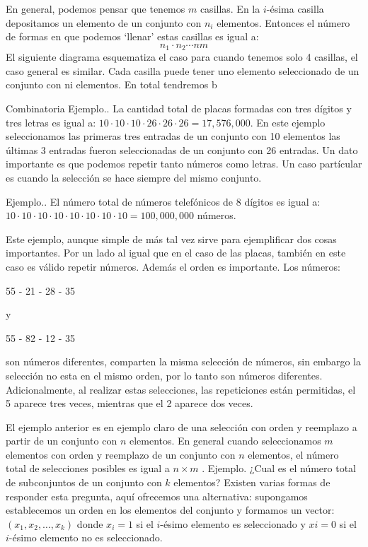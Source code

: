 \documentclass[14pt]{extreport}
\theoremstyle{definicion}
\theoremstyle{propiedad}
\begin{document}
En general, podemos pensar que tenemos $m$ casillas. En la $i$-ésima casilla depositamos un elemento de un conjunto con $n_i$ elementos. Entonces el número de formas en que podemos `llenar' estas casillas es igual a:
$$
  n_1\cdot n_2 \cdots nm
$$
El siguiente diagrama esquematiza el caso para cuando tenemos solo 4 casillas, el caso general es similar. Cada casilla puede tener uno elemento seleccionado de un conjunto con ni elementos. En total tendremos b

Combinatoria Ejemplo.. La cantidad total de placas formadas con tres dígitos y tres letras es igual a: $10 \cdot 10 \cdot 10 \cdot 26 \cdot 26 \cdot 26 = 17,576,000$. En este ejemplo seleccionamos las primeras tres entradas de un conjunto con 10 elementos las últimas 3 entradas fueron seleccionadas de un conjunto con 26 entradas. Un dato importante es que podemos repetir tanto números como letras. Un caso partícular es cuando la selección se hace siempre del mismo conjunto.

Ejemplo.. El número total de números telefónicos de 8 dígitos es igual a: $10 \cdot 10 \cdot 10 \cdot 10 \cdot 10 \cdot 10 \cdot 10 \cdot 10 = 100, 000, 000$ números.

Este ejemplo, aunque simple de más tal vez sirve para ejemplificar dos cosas importantes. Por un lado al igual que en el caso de las placas, también en este caso es válido repetir números. Además el orden es importante. Los números:

\begin{center}
  55 - 21 - 28 - 35
\end{center}

y
\begin{center}
  55 - 82 - 12 - 35
\end{center}


son números diferentes, comparten la misma selección de números, sin embargo la selección no esta en el mismo orden, por lo tanto son números diferentes. Adicionalmente, al realizar estas selecciones, las repeticiones están permitidas, el 5 aparece tres veces, mientras que el 2 aparece dos veces.

El ejemplo anterior es en ejemplo claro de una selección con orden y reemplazo a partir de un conjunto con $n$ elementos. En general cuando seleccionamos $m$ elementos con orden y reemplazo de un conjunto con $n$ elementos, el número total de selecciones posibles es igual a $n\times m$ . Ejemplo. ¿Cual es el número total de subconjuntos de un conjunto con $k$ elementos? Existen varias formas de responder esta pregunta, aquí ofrecemos una alternativa: supongamos establecemos un orden en los elementos del conjunto y formamos un vector: $(x_1 , x_2,\ldots, x_k )$ donde $x_i = 1$ si el $i$-ésimo elemento es seleccionado y $xi = 0$ si el $i$-ésimo elemento no es seleccionado.
\end{document}
